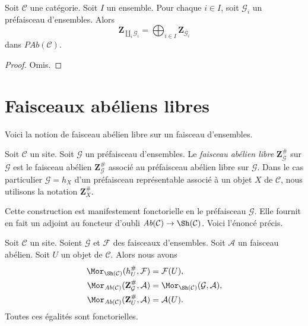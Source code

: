 \begin{lemma}
\label{lemma-coproduct-sum-free-abelian-presheaf}
Soit $\mathcal{C}$ une catégorie. Soit $I$ un ensemble. Pour chaque
$i \in I$, soit $\mathcal{G}_i$ un préfaisceau d'ensembles. Alors
$$
\mathbf{Z}_{\coprod_i \mathcal{G}_i}
=
\bigoplus\nolimits_{i \in I} \mathbf{Z}_{\mathcal{G}_i}
$$
dans $\textit{PAb}(\mathcal{C})$.
\end{lemma}

\begin{proof}
Omis.
\end{proof}



\section{Faisceaux abéliens libres}
\label{section-free-abelian-sheaf}

\noindent
Voici la notion de faisceau abélien libre sur un faisceau d'ensembles.

\begin{definition}
\label{definition-free-abelian-sheaf-on}
Soit $\mathcal{C}$ un site. Soit $\mathcal{G}$ un préfaisceau d'ensembles. Le
{\it faisceau abélien libre} $\mathbf{Z}_\mathcal{G}^\#$ sur $\mathcal{G}$
est le faisceau abélien $\mathbf{Z}_\mathcal{G}^\#$ associé au préfaisceau
abélien libre sur $\mathcal{G}$. Dans le cas particulier
$\mathcal{G} = h_X$ d'un préfaisceau représentable associé à un objet $X$ de
$\mathcal{C}$, nous utilisons la notation $\mathbf{Z}_X^\#$.
\end{definition}

\noindent
Cette construction est manifestement fonctorielle en le préfaisceau
$\mathcal{G}$. Elle fournit en fait un adjoint au foncteur d'oubli
$\textit{Ab}(\mathcal{C}) \to \Sh(\mathcal{C})$. Voici l'énoncé précis.

\begin{lemma}
\label{lemma-obvious-adjointness-sheaves}
Soit $\mathcal{C}$ un site. Soient $\mathcal{G}$ et $\mathcal{F}$ des
faisceaux d'ensembles. Soit $\mathcal{A}$ un faisceau abélien. Soit $U$ un
objet de $\mathcal{C}$. Alors nous avons
\begin{align*}
\Mor_{\Sh(\mathcal{C})}(h_U^\#, \mathcal{F})
& =
\mathcal{F}(U), \\
\Mor_{\textit{Ab}(\mathcal{C})}(\mathbf{Z}_\mathcal{G}^\#,
\mathcal{A})
& =
\Mor_{\Sh(\mathcal{C})}(\mathcal{G}, \mathcal{A}), \\
\Mor_{\textit{Ab}(\mathcal{C})}(\mathbf{Z}_U^\#, \mathcal{A})
& =
\mathcal{A}(U).
\end{align*}
Toutes ces égalités sont fonctorielles.
\end{lemma}

